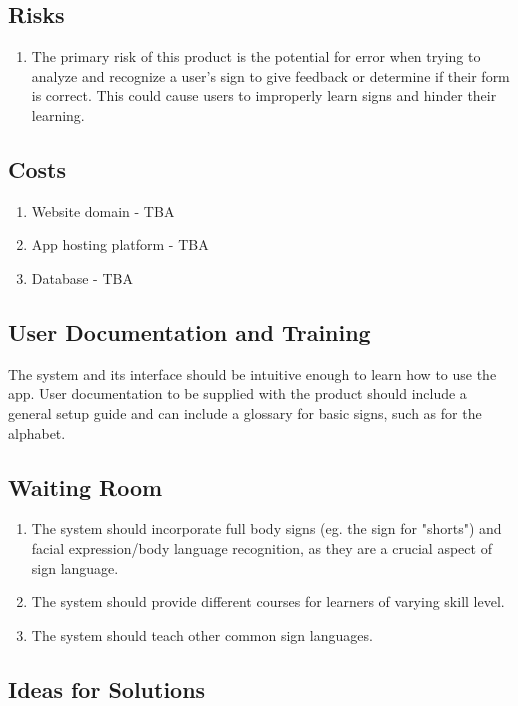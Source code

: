 \documentclass[12pt, titlepage]{article}
\begin{document}
\subsection{Risks}

\begin{enumerate}
    \item The primary risk of this product is the potential for error when trying to analyze and recognize a user's sign to give feedback or determine if their form is correct. This could cause users to improperly learn signs and hinder their learning.
\end{enumerate}

\subsection{Costs}
\begin{enumerate}
    \item Website domain - TBA
    \item App hosting platform - TBA
    \item Database - TBA
\end{enumerate}

\subsection{User Documentation and Training}
The system and its interface should be intuitive enough to learn how to use the app. User documentation to be supplied with the product should include a general setup guide and can include a glossary for basic signs, such as for the alphabet.

\subsection{Waiting Room}
\begin{enumerate}
    \item The system should incorporate full body signs (eg. the sign for "shorts") and facial expression/body language recognition, as they are a crucial aspect of sign language.
    \item The system should provide different courses for learners of varying skill level.
    \item The system should teach other common sign languages.
\end{enumerate}

\subsection{Ideas for Solutions}
\end{document}
